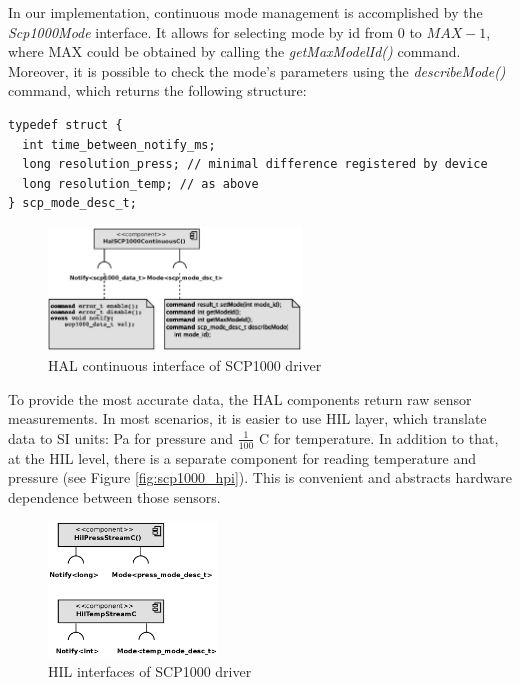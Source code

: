 In our implementation, continuous mode management is accomplished by the  \emph{Scp1000Mode} interface.
It allows for selecting mode by id from $0$ to $MAX - 1$, where MAX could be obtained by calling the \emph{getMaxModelId()} command.
Moreover, it is possible to check the mode's parameters using the \emph{describeMode()} command, which returns the following structure:
\begin{verbatim}
typedef struct {
  int time_between_notify_ms;
  long resolution_press; // minimal difference registered by device
  long resolution_temp; // as above
} scp_mode_desc_t;
\end{verbatim}


\begin{figure}[h]
  \centering
  \includegraphics[width=0.6\textwidth]{diagrams/scp1000_continous.eps}
  \caption{HAL continuous interface of SCP1000 driver}
  \label{fig:scp1000_continous}
\end{figure}

To provide the most accurate data, the HAL components return raw sensor measurements.
In most scenarios, it is easier to use HIL layer, which translate data to SI units: Pa for pressure and $\frac{1}{100}$ C for temperature.
In addition to that, at the HIL level, there is a separate component for reading temperature and pressure (see Figure \ref{fig:scp1000_hpi}).
This is convenient and abstracts hardware dependence between those sensors.

\begin{figure}[h]
  \centering
  \includegraphics[width=0.4\textwidth]{diagrams/scp1000_hil.eps}
  \caption{HIL interfaces of SCP1000 driver}
  \label{fig:scp1000_hil}
\end{figure}

